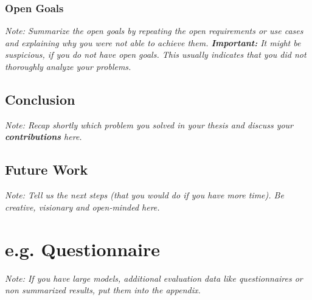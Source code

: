 \documentclass[a4paper,12pt,twoside]{report}
\begin{document}
\subsection{Open Goals}

\textit{Note: Summarize the open goals by repeating the open requirements or use cases and explaining why you were not able to achieve them. \textbf{Important:} It might be suspicious, if you do not have open goals. This usually indicates that you did not thoroughly analyze your problems.}

\section{Conclusion}

\textit{Note: Recap shortly which problem you solved in your thesis and discuss your \textbf{contributions} here.}

\section{Future Work}

\textit{Note: Tell us the next steps  (that you would do if you have more time). Be creative, visionary and open-minded here.}



\appendix

\chapter{e.g. Questionnaire}

\textit{Note: If you have large models, additional evaluation data like questionnaires or non summarized results, put them into the appendix.}


\clearpage

\listoffigures
\clearpage

\listoftables
\clearpage



\end{document}
